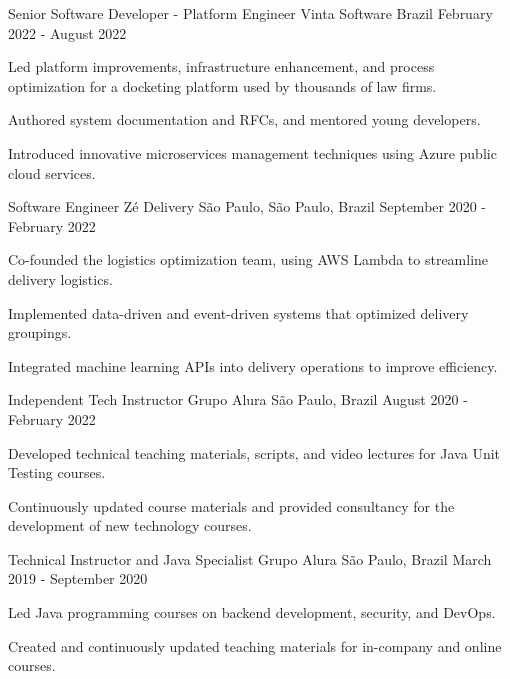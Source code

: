 \begin{cventries}
\cventry
    {Senior Software Developer - Platform Engineer} %
    {Vinta Software} %
    {Brazil} %
    {February 2022 - August 2022} %
    {
      \begin{cvitems} %
        \item {Led platform improvements, infrastructure enhancement, and process optimization for a docketing platform used by thousands of law firms.}
        \item {Authored system documentation and RFCs, and mentored young developers.}
        \item {Introduced innovative microservices management techniques using Azure public cloud services.}
      \end{cvitems}
    }

\cventry
    {Software Engineer} %
    {Zé Delivery} %
    {São Paulo, São Paulo, Brazil} %
    {September 2020 - February 2022} %
    {
      \begin{cvitems} %
        \item {Co-founded the logistics optimization team, using AWS Lambda to streamline delivery logistics.}
        \item {Implemented data-driven and event-driven systems that optimized delivery groupings.}
        \item {Integrated machine learning APIs into delivery operations to improve efficiency.}
      \end{cvitems}
    }

\cventry
    {Independent Tech Instructor} %
    {Grupo Alura} %
    {São Paulo, Brazil} %
    {August 2020 - February 2022} %
    {
      \begin{cvitems} %
        \item {Developed technical teaching materials, scripts, and video lectures for Java Unit Testing courses.}
        \item {Continuously updated course materials and provided consultancy for the development of new technology courses.}
      \end{cvitems}
    }

\cventry
    {Technical Instructor and Java Specialist} %
    {Grupo Alura} %
    {São Paulo, Brazil} %
    {March 2019 - September 2020} %
    {
      \begin{cvitems} %
        \item {Led Java programming courses on backend development, security, and DevOps.}
        \item {Created and continuously updated teaching materials for in-company and online courses.}
      \end{cvitems}
    }


\end{cventries}
